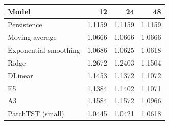 \begin{tabular}{lrrr}
\toprule
Model & 12 & 24 & 48 \\
\midrule
Persistence & 1.1159 & 1.1159 & 1.1159 \\
Moving average & 1.0666 & 1.0666 & 1.0666 \\
Exponential smoothing & 1.0686 & 1.0625 & 1.0618 \\
Ridge & 1.2672 & 1.2403 & 1.1504 \\
DLinear & 1.1453 & 1.1372 & 1.1072 \\
E5 & 1.1384 & 1.1402 & 1.1071 \\
A3 & 1.1584 & 1.1572 & 1.0966 \\
PatchTST (small) & 1.0445 & 1.0421 & 1.0618 \\
\bottomrule
\end{tabular}
